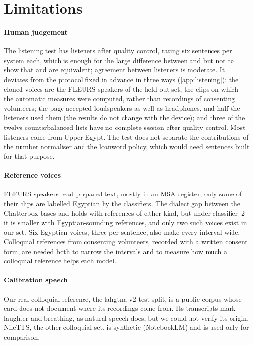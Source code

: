\section{Limitations}\label{sec:limitations}

\paragraph{Human judgement}
The listening test has  listeners after quality control, rating six sentences per system each, which is enough
for the large difference between \vox and \cbthree but not to show that \BA and \vox are equivalent; agreement between
listeners is moderate. It deviates from the protocol fixed in advance in three ways (\cref{app:listening}): the cloned
voices are the FLEURS speakers of the held-out set, the clips on which the automatic measures were computed, rather than
recordings of consenting volunteers; the page accepted loudspeakers as well as headphones, and half the listeners used
them (the results do not change with the device); and three of the twelve counterbalanced lists have no complete session
after quality control. Most listeners come from Upper Egypt. The test does not separate the contributions of the number
normaliser and the loanword policy, which would need sentences built for that purpose.

\paragraph{Reference voices}
FLEURS speakers read prepared text, mostly in an MSA register; only some of their clips are labelled Egyptian by the
classifiers. The dialect gap between the Chatterbox bases and \vox holds with references of either kind, but under
classifier~2 it is smaller with Egyptian-sounding references, and only two such voices exist in our set. Six Egyptian
voices, three per sentence, also make every interval wide. Colloquial references from consenting volunteers, recorded
with a written consent form, are needed both to narrow the intervals and to measure how much a colloquial
reference helps each model.

\paragraph{Calibration speech}
Our real colloquial reference, the lahgtna-v2 test split, is a public corpus whose card does not document where its
recordings come from. Its transcripts mark laughter and breathing, as natural speech does, but we could not verify its
origin. NileTTS, the other colloquial set, is synthetic (NotebookLM) and is used only for comparison.

